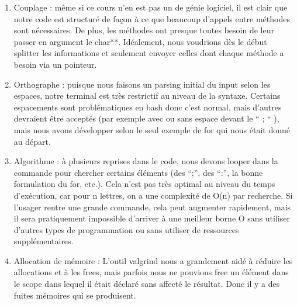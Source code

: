 \documentclass{article}
\begin{document}
\begin{enumerate}
\item Couplage : même si ce cours n’en est pas un de génie logiciel, il est clair que notre code est structuré de façon à ce que beaucoup d’appels entre méthodes sont nécessaires. De plus, les méthodes ont presque toutes besoin de leur passer en argument le char**. Idéalement, nous voudrions dès le début splitter les informations et seulement envoyer celles dont chaque méthode a besoin via un pointeur. 
\item Orthographe : puisque nous faisons un parsing initial du input selon les espaces, notre terminal est très restrictif au niveau de la syntaxe. Certains espacements sont problématiques en bash donc c’est normal, mais d’autres devraient être acceptés (par exemple avec ou sans espace devant le “ ; “ ), mais nous avons développer selon le seul exemple de for qui nous était donné au départ. 

\item Algorithme : à plusieurs reprises dans le code, nous devons looper dans la commande pour chercher certains éléments (des “;”, des “:”, la bonne formulation du for, etc.). Cela n’est pas très optimal au niveau du temps d’exécution, car pour n lettres, on a une complexité de O(n) par recherche. Si l’usager rentre une grande commande, cela peut augmenter rapidement, mais il sera pratiquement impossible d'arriver à une meilleur borne O sans utiliser d'autres types de programmation ou sans utiliser de ressources supplémentaires.

\item Allocation de mémoire : L’outil valgrind nous a grandement aidé à réduire les allocations et à les frees, mais parfois nous ne pouvions free un élément dans le scope dans lequel il était déclaré sans affecté le résultat. Donc il y a des fuites mémoires qui se produisent. 

\end{enumerate}










\end{document}

